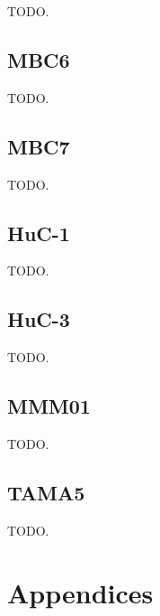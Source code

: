 \documentclass[a4paper, draft, oneside]{memoir}
\begin{document}
TODO.

\chapter{MBC6}

TODO.

\chapter{MBC7}

TODO.

\chapter{HuC-1}

TODO.

\chapter{HuC-3}

TODO.

\chapter{MMM01}

TODO.

\chapter{TAMA5}

TODO.

\part*{Appendices}

\begin{appendices}


\end{appendices}


\end{document}
